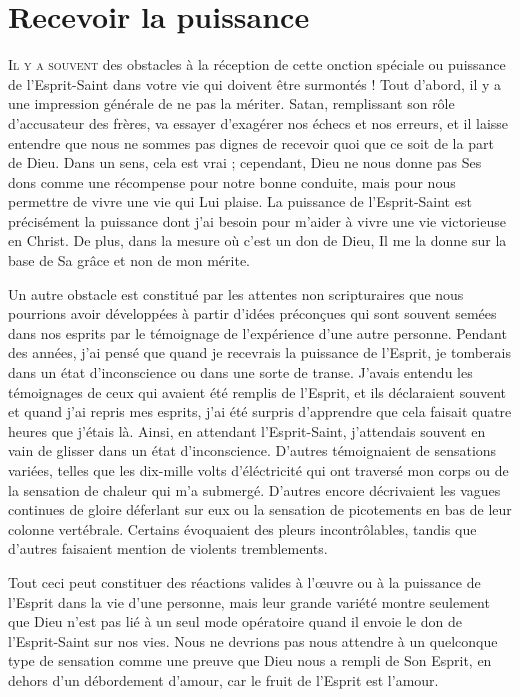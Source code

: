 \chapter{Recevoir la puissance}

\lettrine{I}{l y a souvent} des obstacles à la réception de cette onction
 spéciale ou puissance de l'Esprit-Saint dans votre vie qui doivent
 être surmontés ! Tout d'abord, il y a une impression générale
 de ne pas la mériter. Satan,  remplissant son rôle d'accusateur
 des frères, va essayer d'exagérer nos échecs et nos erreurs,
 et il laisse entendre que nous ne sommes pas dignes de recevoir quoi que ce soit
 de la part de Dieu. Dans un sens, cela est vrai ;
 cependant, Dieu ne nous donne pas Ses dons comme une récompense
 pour notre bonne conduite, mais pour nous permettre de vivre une vie
 qui Lui plaise. La puissance de l'Esprit-Saint est précisément
 la puissance dont j'ai besoin pour m'aider à vivre une vie victorieuse
 en Christ. De plus, dans la mesure où c'est un don de Dieu,
 Il me la donne sur la base de Sa grâce et non de mon mérite.

Un autre obstacle est constitué par les attentes non scripturaires
 que nous pourrions avoir développées à partir d'idées préconçues
 qui sont souvent semées dans nos esprits par le témoignage de l'expérience 
 d'une autre personne. Pendant des années, j'ai pensé que
 quand je recevrais la puissance de l'Esprit, je tomberais dans un état
 d'inconscience ou dans une sorte de transe.
 J'avais entendu les témoignages de ceux qui avaient été remplis de l'Esprit,
 et ils déclaraient souvent\frcolon{} \Og [\dots{}] et quand j'ai repris mes esprits,
 j'ai été surpris d'apprendre que cela faisait quatre heures
 que j'étais là. \Fg{}
 Ainsi, en attendant l'Esprit-Saint, j'attendais souvent en vain
 de glisser dans un état d'inconscience.
 D'autres témoignaient de sensations variées, telles que
 \Og les dix-mille volts d'éléctricité qui ont traversé mon corps \Fg{} ou
 \Og de la sensation de chaleur qui m'a submergé. \Fg{}
 D'autres encore décrivaient les vagues continues de gloire déferlant
 sur eux ou la sensation de picotements en bas de leur colonne vertébrale.
 Certains évoquaient des pleurs incontrôlables,
 tandis que d'autres faisaient mention de violents tremblements.

Tout ceci peut constituer des réactions valides à l'œuvre
 ou à la puissance de l'Esprit dans la vie d'une personne,
 mais leur grande variété montre seulement que Dieu n'est pas lié
 à un seul mode opératoire quand il envoie le don de l'Esprit-Saint sur nos vies.
 Nous ne devrions pas nous attendre à un quelconque type de sensation
 comme une preuve que Dieu nous a rempli de Son Esprit,
 en dehors d'un débordement d'amour, car le fruit de l'Esprit est l'amour.

